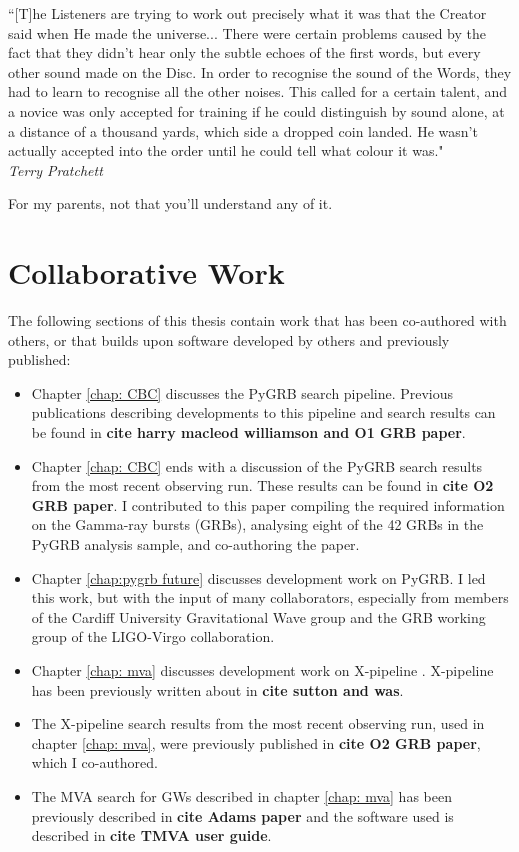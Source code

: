 \documentclass[11pt]{cuthesis}
\newcommand{\xp}{X-pipeline }
\begin{document}
\begin{dedication}
    ``[T]he Listeners are trying to work out precisely what it was that the Creator said when He made the universe...  There were certain problems caused by the fact that they didn't hear only the subtle echoes of the first words, but every other sound made on the Disc. In order to recognise the sound of the Words, they had to learn to recognise all the other noises. This called for a certain talent, and a novice was only accepted for training if he could distinguish by sound alone, at a distance of a thousand yards, which side a dropped coin landed. He wasn't actually accepted into the order until he could tell what colour it was."\\
    \vspace{1cm}
    \hfill \textit{Terry Pratchett}
\end{dedication}

\begin{dedication}
For my parents, not that you'll understand any of it.
\end{dedication}



\chapter*{Collaborative Work}
The following sections of this thesis contain work that has been co-authored with others, or that builds upon software developed by others and previously published:
\begin{itemize}
\item Chapter \ref{chap: CBC} discusses the PyGRB search pipeline. Previous publications describing developments to this pipeline and search results can be found in \textbf{cite harry macleod williamson and O1 GRB paper}. 
\item Chapter \ref{chap: CBC} ends with a discussion of the PyGRB search results from the most recent observing run. These results can be found in \textbf{cite O2 GRB paper}. I contributed to this paper compiling the required information on the Gamma-ray bursts (GRBs), analysing eight of the 42 GRBs in the PyGRB analysis sample, and co-authoring the paper.
\item Chapter \ref{chap:pygrb future} discusses development work on PyGRB. I led this work, but with the input of many collaborators, especially from members of the Cardiff University Gravitational Wave group and the GRB working group of the LIGO-Virgo collaboration.
\item Chapter \ref{chap: mva} discusses development work on {\xp}. \xp has been previously written about in \textbf{cite sutton and was}. 
\item The \xp search results from the most recent observing run, used in chapter \ref{chap: mva}, were previously published in \textbf{cite O2 GRB paper}, which I co-authored. 
\item The MVA search for GWs described in chapter \ref{chap: mva} has been previously described in \textbf{cite Adams paper} and the software used is described in \textbf{cite TMVA user guide}.  
\end{itemize}
\end{document}
